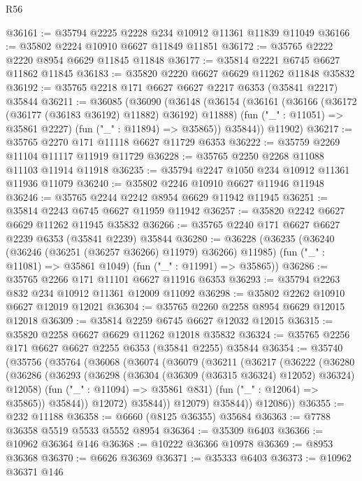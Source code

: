 \begin{lexlean}{R56}
\begin{coremodule}
@36161 := @35794 @2225 @2228 @234 @10912 @11361 @11839 @11049
@36166 := @35802 @2224 @10910 @6627 @11849 @11851
@36172 := @35765 @2222 @2220 @8954 @6629 @11845 @11848
@36177 := @35814 @2221 @6745 @6627 @11862 @11845
@36183 := @35820 @2220 @6627 @6629 @11262 @11848 @35832
@36192 := @35765 @2218 @171 @6627 @6627 @2217 @6353 (@35841 @2217) @35844
@36211 := @36085
    (@36090
      (@36148
        (@36154
          (@36161
            (@36166 (@36172 (@36177 (@36183 @36192) @11882) @36192) @11888)
            (fun ("_" : @11051) => @35861 @2227)
            (fun ("_" : @11894) => @35865))
          @35844))
      @11902)
@36217 := @35765 @2270 @171 @11118 @6627 @11729 @6353
@36222 := @35759 @2269 @11104 @11117 @11919 @11729
@36228 := @35765 @2250 @2268 @11088 @11103 @11914 @11918
@36235 := @35794 @2247 @1050 @234 @10912 @11361 @11936 @11079
@36240 := @35802 @2246 @10910 @6627 @11946 @11948
@36246 := @35765 @2244 @2242 @8954 @6629 @11942 @11945
@36251 := @35814 @2243 @6745 @6627 @11959 @11942
@36257 := @35820 @2242 @6627 @6629 @11262 @11945 @35832
@36266 := @35765 @2240 @171 @6627 @6627 @2239 @6353 (@35841 @2239) @35844
@36280 := @36228
    (@36235
      (@36240 (@36246 (@36251 (@36257 @36266) @11979) @36266) @11985)
      (fun ("_" : @11081) => @35861 @1049)
      (fun ("_" : @11991) => @35865))
@36286 := @35765 @2266 @171 @11101 @6627 @11916 @6353
@36293 := @35794 @2263 @832 @234 @10912 @11361 @12009 @11092
@36298 := @35802 @2262 @10910 @6627 @12019 @12021
@36304 := @35765 @2260 @2258 @8954 @6629 @12015 @12018
@36309 := @35814 @2259 @6745 @6627 @12032 @12015
@36315 := @35820 @2258 @6627 @6629 @11262 @12018 @35832
@36324 := @35765 @2256 @171 @6627 @6627 @2255 @6353 (@35841 @2255) @35844
@36354 := @35740
    (@35756
      (@35764
        (@36068
          (@36074
            (@36079
              (@36211
                (@36217
                  (@36222
                    (@36280
                      (@36286
                        (@36293
                          (@36298 (@36304 (@36309 (@36315 @36324) @12052) @36324) @12058)
                          (fun ("_" : @11094) => @35861 @831)
                          (fun ("_" : @12064) => @35865))
                        @35844))
                    @12072)
                  @35844))
              @12079)
            @35844))
        @12086))
@36355 := @232 @11188
@36358 := @6660 (@8125 @36355) @35684
@36363 := @7788 @36358 @5519 @5533 @5552 @8954
@36364 := @35309 @6403
@36366 := @10962 @36364 @146
@36368 := @10222 @36366 @10978
@36369 := @8953 @36368
@36370 := @6626 @36369
@36371 := @35333 @6403
@36373 := @10962 @36371 @146

\end{coremodule}
\end{lexlean}
